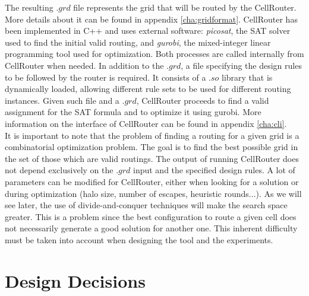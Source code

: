The resulting $.grd$ file represents the grid that will be routed by the CellRouter. More details about it can be found in appendix \ref{cha:gridformat}. CellRouter has been implemented in C++ and uses external software: \textit{picosat}, the SAT solver used to find the initial valid routing, and \textit{gurobi}, the mixed-integer linear programming tool used for optimization. Both processes are called internally from CellRouter when needed. In addition to the $.grd$, a file specifying the design rules to be followed by the router is required. It consists of a $.so$ library that is dynamically loaded, allowing different rule sets to be used for different routing  instances. Given such file and a $.grd$, CellRouter proceeds to find a valid assignment for the SAT formula and to optimize it using gurobi. More information on the interface of CellRouter can be found in appendix \ref{cha:cli}. \\

It is important to note that the problem of finding a routing for a given grid is a combinatorial optimization problem. The goal is to find the best possible grid in the set of those which are valid routings. The output of running CellRouter does not depend exclusively on the $.grd$ input and the specified design rules. A lot of parameters can be modified for CellRouter, either when looking for a solution or during optimization (halo size, number of escapes, heuristic rounds...). As we will see later, the use of divide-and-conquer techniques will make the  search space greater. This is a problem since the best configuration to route a given cell does not necessarily generate a good solution for another one. This inherent difficulty must be taken into account when designing the tool and the experiments. \\


\section{Design Decisions}

